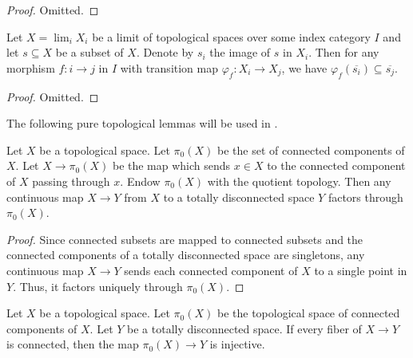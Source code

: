 \begin{proof}
  Omitted.
\end{proof}

\begin{lemma}
  \label{thm:closure-limit-compatible}
  Let $X = \lim_i X_i$ be a limit of topological spaces over some index category \(I\) and let
  $s \subseteq X$ be a subset of \(X\). Denote by $s_i$ the image of $s$ in $X_i$. Then for any morphism \(f : i \to j\) in \(I\) with transition map \(\varphi_{f} : X_i \to X_j\), we have \(\varphi_{f}(\overline{s_i}) \subseteq \overline{s_j}\).
  \leanok
\end{lemma}

\begin{proof}
  Omitted.
\end{proof}

The following pure topological lemmas will be used in .

\begin{lemma}
  \label{thm:pi0-to-totally-disconnected}
  Let \(X\) be a topological space. Let \(\pi_0(X)\) be the set of connected components of \(X\). Let \(X \to \pi_0(X)\) be the map which sends \(x \in X\) to the connected component of \(X\) passing through \(x\). Endow \(\pi_0(X)\) with the quotient topology. Then %
  any continuous map \(X \to Y\) from \(X\) to a totally disconnected space \(Y\) factors through \(\pi_0(X)\).
\end{lemma}

\begin{proof}
  Since connected subsets are mapped to connected subsets and the connected components of a totally disconnected space are singletons, any continuous map \(X \to Y\) sends each connected component of \(X\) to a single point in \(Y\). Thus, it factors uniquely through \(\pi_0(X)\).
\end{proof}

\begin{lemma}
  \label{thm:pi0-to-totally-disconnected-injective}
  Let \(X\) be a topological space. Let \(\pi_0(X)\) be the topological space of connected components of \(X\). Let \(Y\) be a totally disconnected space. If every fiber of \(X \to Y\) is connected, then the map \(\pi_0(X) \to Y\) is injective.
\end{lemma}

